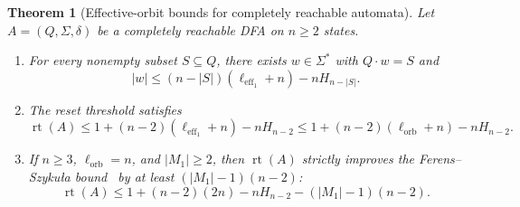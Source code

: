 \documentclass[11pt,a4paper]{article}
\newtheorem{theorem}{Theorem}[section]
\theoremstyle{definition}
\theoremstyle{remark}
\newcommand{\rt}{\operatorname{rt}}
\newcommand{\leff}{\ell_{\mathrm{eff}_1}}
\newcommand{\lorb}{\ell_{\mathrm{orb}}}
\begin{document}
\begin{theorem}[Effective-orbit bounds for completely reachable automata]\label{thm:cr-eff-orbit}
Let $A = (Q, \Sigma, \delta)$ be a completely reachable DFA on $n \ge 2$ states.
\begin{enumerate}[label=\textup{(\arabic*)},leftmargin=*,nosep]
  \item For every nonempty subset $S \subseteq Q$, there exists $w \in \Sigma^*$ with $Q \cdot w = S$ and
  \[
    |w| \le (n - |S|)(\leff + n) - n H_{n - |S|}.
  \]
  \item The reset threshold satisfies
  \[
    \rt(A) \le 1 + (n - 2)(\leff + n) - n H_{n - 2} \le 1 + (n - 2)(\lorb + n) - n H_{n - 2}.
  \]
  \item If $n \ge 3$, $\lorb = n$, and $|M_1| \ge 2$, then $\rt(A)$ strictly improves the Ferens--Szyku\l a bound~\cite{FS2025} by at least $(|M_1| - 1)(n - 2)$:
  \[
    \rt(A) \le 1 + (n - 2)(2n) - n H_{n - 2} - (|M_1| - 1)(n - 2).
  \]
\end{enumerate}
\end{theorem}
\end{document}
